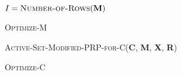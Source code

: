 
\begin{algorithm}[h]
$I = \textsc{Number-of-Rows}(\textbf{M})$\;
\caption{\textsc{Optimize-M}}
\label{alg:opt-M}
\end{algorithm}

\begin{algorithm}[h]
\textsc{Active-Set-Modified-PRP-for-C}(\textbf{C}, \textbf{M}, \textbf{X}, \textbf{R})\;
\caption{\textsc{Optimize-C}}
\label{alg:opt-C}
\end{algorithm}

